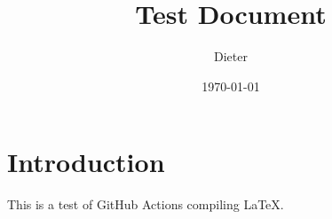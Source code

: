 \documentclass{article}
\title{Test Document}
\author{Dieter}
\date{\today}
\begin{document}
	
	\maketitle
	
	\section{Introduction}
	
	This is a test of GitHub Actions compiling LaTeX.
	
\end{document}
